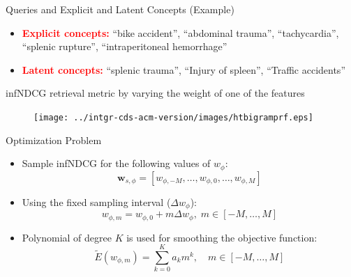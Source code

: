 \documentclass[final]{beamer}
\newlength{\onecolwid}
\begin{document}
\begin{frame}[t]
\begin{columns}[t]
\begin{column}{\onecolwid}
\begin{block}{Queries and Explicit and Latent Concepts (Example)}
\begin{itemize}
\item  \textcolor{red}{\textbf{Explicit concepts:}} ``bike accident'', ``abdominal trauma'', ``tachycardia'', ``splenic rupture'', ``intraperitoneal hemorrhage''

\item  \textcolor{red}{\textbf{Latent concepts:}}
  ``splenic trauma'', ``Injury of spleen'', ``Traffic accidents''


\end{itemize}
\end{block}



\begin{block}{infNDCG retrieval metric by varying the weight of one of the features}
  \begin{figure}[!htb]
  \centering
  \texttt{[image: ../intgr-cds-acm-version/images/htbigramprf.eps]}
  \end{figure}

\end{block}

\begin{block}{Optimization Problem}
  \begin{itemize}

\item Sample infNDCG for the following values of $w_\phi$:
\begin{equation*}
\mathbf{w}_{s,\phi}=[w_{\phi,-M},\dots, w_{\phi,0}, \dots, w_{\phi,M}]
\end{equation*}

\item Using the fixed sampling interval ($\Delta w_\phi$):
\begin{equation*}
w_{\phi,m}=w_{\phi,0}+m\Delta w_\phi, \; m\in[-M,\dots, M]
\end{equation*}


\item Polynomial of degree $K$ is used for smoothing the objective function:
\begin{equation*}
\tilde E(w_{\phi,m})=\sum_{k=0}^{K} a_{k} {m}^k, \quad m\in[-M,\dots, M]
\end{equation*}

\end{itemize}
\end{block}







\end{column}
\end{columns}
\end{frame}
\end{document}
